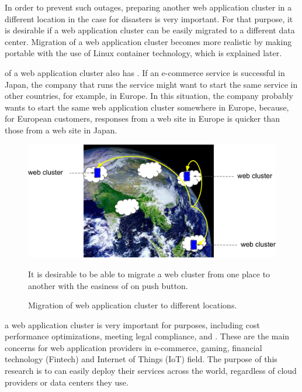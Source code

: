 In order to prevent such outages, preparing another web application cluster in a different location in the case for disasters is very important.
For that purpose, it is desirable if a web application cluster can be easily migrated to a different data center.
Migration of a web application cluster becomes more realistic by making  portable with the use of Linux container technology, which is explained later.

 of a web application cluster also has .
If an e-commerce service is successful in Japan, the company that runs the service might want to start the same service in other countries, for example, in Europe.
In this situation, the company probably wants to start the same web application cluster somewhere in Europe, because, for European customers, responses from a web site in Europe is quicker than those from a web site in Japan.
  

\begin{figure}[h]
\begin{center}
\includegraphics[width=0.7\columnwidth]{Figs/earth}
\end{center}
\caption{
Migration of web application cluster to different locations.
}
\centering\parbox[c]{0.9\columnwidth}{
It is desirable to be able to migrate a web cluster from one place to another with the easiness of on push button.
}
\label{fig:earth}
\end{figure}

 a web application cluster is  very important for  purposes, including cost performance optimizations, meeting legal compliance, and .
These are the main concerns for web application providers in e-commerce, gaming, financial technology (Fintech) and Internet of Things (IoT) field.
The purpose of this research is to  can easily deploy their services across the world, regardless of cloud providers or data centers they use.


